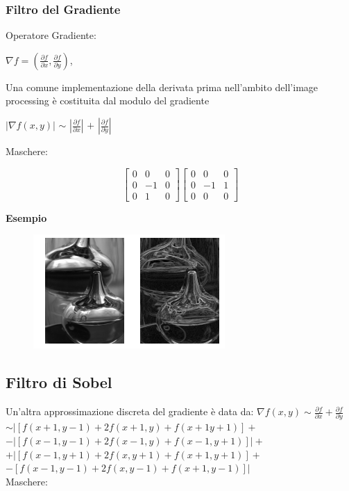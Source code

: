 \subsubsection{Filtro del Gradiente}
Operatore Gradiente:
\begin{center}
    $\nabla f=(\frac{\partial{f}}{\partial{x}}, \frac{\partial{f}}{\partial{y}})$,
\end{center}
Una comune implementazione della derivata prima nell'ambito dell'image processing è costituita dal modulo del gradiente
\begin{center}
    $| \nabla f(x,y) |$ $\sim$ $|\frac{\partial{f}}{\partial{x}}|$ $+$ $|\frac{\partial{f}}{\partial{y}}|$
\end{center}
Maschere:
\begin{center}
    \[
        \begin{bmatrix}
            0 & 0  & 0 \\
            0 & -1 & 0 \\
            0 & 1  & 0
        \end{bmatrix}
        \begin{bmatrix}
            0 & 0  & 0 \\
            0 & -1 & 1 \\
            0 & 0  & 0
        \end{bmatrix}
    \]
\end{center}
\textbf{Esempio}
\begin{figure}[H]
    \centering
    \includegraphics[width=\linewidth, keepaspectratio]{capitoli/immagini/imgs/gradiente.png}
\end{figure}

\subsection{Filtro di Sobel}
Un'altra approssimazione discreta del gradiente è data da:
$\nabla f(x,y) \sim \frac{\partial{f}}{\partial{x}} + \frac{\partial{f}}{\partial{y}}$
\\$\sim  |[f(x+1,y-1) + 2f(x+1,y) + f(x+1 y+1)]+$
    \\$ - |[f(x-1, y-1)+2f(x-1,y) + f(x-1, y+1)]|+$
\\$ + |[f(x-1, y+1) + 2f(x,y+1)+f(x+1,y+1)]+$
    \\$ - [f(x-1,y -1) + 2f(x,y-1) + f(x+1,y-1)]|$
\\Maschere:


